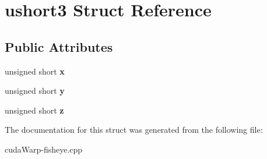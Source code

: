\hypertarget{structushort3}{}\section{ushort3 Struct Reference}
\label{structushort3}
\subsection*{Public Attributes}
\begin{DoxyCompactItemize}
\item 
unsigned short {\bfseries x}\hypertarget{structushort3_aac09b8fca61e98577b4c72b716544581}{}\label{structushort3_aac09b8fca61e98577b4c72b716544581}

\item 
unsigned short {\bfseries y}\hypertarget{structushort3_afb1f1cb28bcab7309b97ec65e66ee0d3}{}\label{structushort3_afb1f1cb28bcab7309b97ec65e66ee0d3}

\item 
unsigned short {\bfseries z}\hypertarget{structushort3_a651b479a74e87b7abbe7de5b4d1d1bf2}{}\label{structushort3_a651b479a74e87b7abbe7de5b4d1d1bf2}

\end{DoxyCompactItemize}


The documentation for this struct was generated from the following file\+:\begin{DoxyCompactItemize}
\item 
cuda\+Warp-\/fisheye.\+cpp\end{DoxyCompactItemize}
